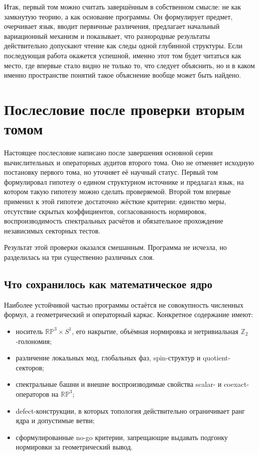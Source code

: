 \documentclass[12pt,a4paper]{article}
\begin{document}
Итак, первый том можно считать завершённым в собственном смысле: не как замкнутую теорию, а как основание программы. Он формулирует предмет, очерчивает язык, вводит первичные различения, предлагает начальный вариационный механизм и показывает, что разнородные результаты действительно допускают чтение как следы одной глубинной структуры. Если последующая работа окажется успешной, именно этот том будет читаться как место, где впервые стало видно не только то, что следует объяснить, но и в каком именно пространстве понятий такое объяснение вообще может быть найдено.

\section{Послесловие после проверки вторым томом}

Настоящее послесловие написано после завершения основной серии вычислительных и операторных аудитов второго тома. Оно не отменяет исходную постановку первого тома, но уточняет её научный статус. Первый том формулировал гипотезу о едином структурном источнике и предлагал язык, на котором такую гипотезу можно сделать проверяемой. Второй том впервые применил к этой гипотезе достаточно жёсткие критерии: единство меры, отсутствие скрытых коэффициентов, согласованность нормировок, воспроизводимость спектральных расчётов и обязательное прохождение независимых секторных тестов.

Результат этой проверки оказался смешанным. Программа не исчезла, но разделилась на три существенно различных слоя.

\subsection{Что сохранилось как математическое ядро}

Наиболее устойчивой частью программы остаётся не совокупность численных формул, а геометрический и операторный каркас. Конкретное содержание имеют:
\begin{itemize}
    \item носитель \(\mathbb{RP}^3\times S^1\), его накрытие, объёмная нормировка и нетривиальная \(\mathbb Z_2\)-голономия;
    \item различение локальных мод, глобальных фаз, spin-структур и quotient-секторов;
    \item спектральные башни и внешне воспроизводимые свойства scalar- и coexact-операторов на \(\mathbb{RP}^3\);
    \item defect-конструкции, в которых топология действительно ограничивает ранг ядра и допустимые ветви;
    \item сформулированные no-go критерии, запрещающие выдавать подгонку нормировки за геометрический вывод.
\end{itemize}
\end{document}
